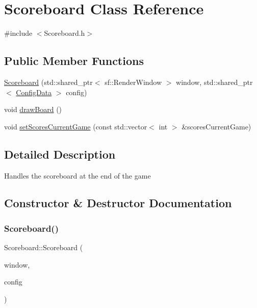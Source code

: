 \hypertarget{classScoreboard}{}\section{Scoreboard Class Reference}
\label{classScoreboard}


{\ttfamily \#include $<$Scoreboard.\+h$>$}

\subsection*{Public Member Functions}
\begin{DoxyCompactItemize}
\item 
\hyperlink{classScoreboard_ae3b3273b61018b83bf72a18649de706f}{Scoreboard} (std\+::shared\+\_\+ptr$<$ sf\+::\+Render\+Window $>$ window, std\+::shared\+\_\+ptr$<$ \hyperlink{classConfigData}{Config\+Data} $>$ config)
\item 
void \hyperlink{classScoreboard_ae12729e1ea694e1ec2d8651a10c582b1}{draw\+Board} ()
\item 
void \hyperlink{classScoreboard_aa968340a9217f6ccd2ef4da7e43303b5}{set\+Scores\+Current\+Game} (const std\+::vector$<$ int $>$ \&scores\+Current\+Game)
\end{DoxyCompactItemize}


\subsection{Detailed Description}
Handles the scoreboard at the end of the game 

\subsection{Constructor \& Destructor Documentation}
\mbox{\label{classScoreboard_ae3b3273b61018b83bf72a18649de706f}} 
\subsubsection{\texorpdfstring{Scoreboard()}{Scoreboard()}}
{\footnotesize\ttfamily Scoreboard\+::\+Scoreboard (\begin{DoxyParamCaption}\item[{std\+::shared\+\_\+ptr$<$ sf\+::\+Render\+Window $>$}]{window,  }\item[{std\+::shared\+\_\+ptr$<$ \hyperlink{classConfigData}{Config\+Data} $>$}]{config }\end{DoxyParamCaption})}


